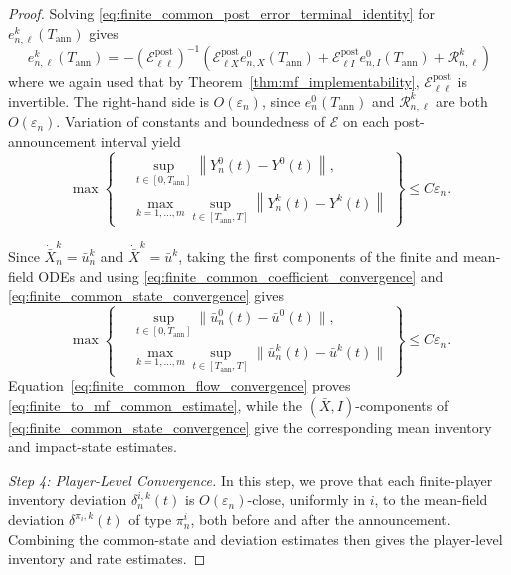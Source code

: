 \documentclass[12pt]{article}
\numberwithin{equation}{section}
\theoremstyle{definition}
\begin{document}
\begin{proof}
Solving \eqref{eq:finite_common_post_error_terminal_identity} for
\(e_{n,\ell}^k(T_{\mathrm{ann}})\) gives
\[
e_{n,\ell}^k(T_{\mathrm{ann}})
=
-\left(\mathcal E^{\mathrm{post}}_{\ell\ell}\right)^{-1}
\left(
\mathcal E^{\mathrm{post}}_{\ell X}e_{n,X}^0(T_{\mathrm{ann}})
+\mathcal E^{\mathrm{post}}_{\ell I}e_{n,I}^0(T_{\mathrm{ann}})
+\mathcal R_{n,\ell}^k
\right)
\]
where we again used that by Theorem~\ref{thm:mf_implementability},
\(\mathcal E^{\mathrm{post}}_{\ell\ell}\) is invertible. The right-hand side
is \(O(\varepsilon_n)\), since \(e_n^0(T_{\mathrm{ann}})\) and
\(\mathcal R_{n,\ell}^k\) are both \(O(\varepsilon_n)\). Variation of constants
and boundedness of \(\mathcal E\) on each post-announcement interval yield
\begin{equation}\label{eq:finite_common_state_convergence}
\max\left\{
\begin{aligned}
&\sup_{t\in[0,T_{\mathrm{ann}}]}
\left\|Y_n^0(t)-Y^0(t)\right\|,\\
&\max_{k=1,\ldots,m}\sup_{t\in[T_{\mathrm{ann}},T]}
\left\|Y_n^k(t)-Y^k(t)\right\|
\end{aligned}
\right\}
\leq
C\varepsilon_n.
\end{equation}

Since \(\dot{\bar X}_n^k=\bar u_n^k\) and
\(\dot{\bar X}^k=\bar u^k\), taking the first components of the finite and
mean-field ODEs and using
\eqref{eq:finite_common_coefficient_convergence} and
\eqref{eq:finite_common_state_convergence} gives
\begin{equation}\label{eq:finite_common_flow_convergence}
\max\left\{
\begin{aligned}
&\sup_{t\in[0,T_{\mathrm{ann}}]}
\|\bar u_n^{0}(t)-\bar u^0(t)\|,\\
&\max_{k=1,\ldots,m}\sup_{t\in[T_{\mathrm{ann}},T]}
\|\bar u_n^{k}(t)-\bar u^k(t)\|
\end{aligned}
\right\}
\leq
C\varepsilon_n.
\end{equation}
Equation~\eqref{eq:finite_common_flow_convergence} proves
\eqref{eq:finite_to_mf_common_estimate}, while the \((\bar X,I)\)-components
of \eqref{eq:finite_common_state_convergence} give the corresponding mean
inventory and impact-state estimates.


\emph{Step 4: Player-Level Convergence.}
In this step, we prove that each finite-player inventory deviation \(\delta^{i,k}_n(t)\) is
\(O(\varepsilon_n)\)-close, uniformly in \(i\), to the mean-field deviation \(\delta^{\pi_i,k}(t)\)
of type \(\pi_n^i\), both before and after the announcement. Combining the
common-state and deviation estimates then gives the player-level inventory
and rate estimates.


\end{proof}
\end{document}
